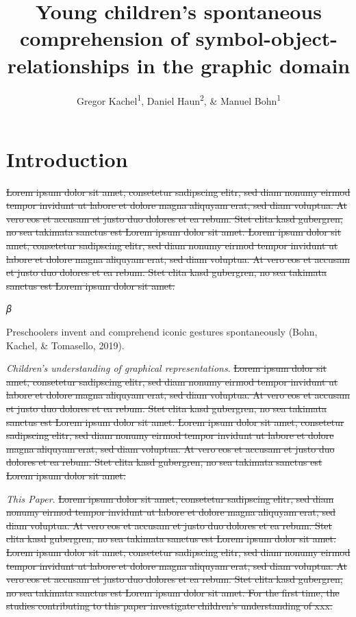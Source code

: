 \documentclass[
  man]{apa6}
\title{Young children's spontaneous comprehension of symbol-object-relationships in the graphic domain}
\author{Gregor Kachel\textsuperscript{1}, Daniel Haun\textsuperscript{2}, \& Manuel Bohn\textsuperscript{1}}
\date{}
\affiliation{\vspace{0.5cm}\textsuperscript{1} Leuphana University\\\textsuperscript{2} Max-Planck-Institute for Evolutionary Anthropology}
\begin{document}
\maketitle

\section{Introduction}\label{introduction}

\st{Lorem ipsum dolor sit amet, consetetur sadipscing elitr, sed diam nonumy eirmod tempor invidunt ut labore et dolore magna aliquyam erat, sed diam voluptua. At vero eos et accusam et justo duo dolores et ea rebum. Stet clita kasd gubergren, no sea takimata sanctus est Lorem ipsum dolor sit amet. Lorem ipsum dolor sit amet, consetetur sadipscing elitr, sed diam nonumy eirmod tempor invidunt ut labore et dolore magna aliquyam erat, sed diam voluptua. At vero eos et accusam et justo duo dolores et ea rebum. Stet clita kasd gubergren, no sea takimata sanctus est Lorem ipsum dolor sit amet.}

𝛽

Preschoolers invent and comprehend iconic gestures spontaneously (Bohn, Kachel, \& Tomasello, 2019).

\emph{Children's understanding of graphical representations}.
\st{Lorem ipsum dolor sit amet, consetetur sadipscing elitr, sed diam nonumy eirmod tempor invidunt ut labore et dolore magna aliquyam erat, sed diam voluptua. At vero eos et accusam et justo duo dolores et ea rebum. Stet clita kasd gubergren, no sea takimata sanctus est Lorem ipsum dolor sit amet. Lorem ipsum dolor sit amet, consetetur sadipscing elitr, sed diam nonumy eirmod tempor invidunt ut labore et dolore magna aliquyam erat, sed diam voluptua. At vero eos et accusam et justo duo dolores et ea rebum. Stet clita kasd gubergren, no sea takimata sanctus est Lorem ipsum dolor sit amet.}

\emph{This Paper}.
\st{Lorem ipsum dolor sit amet, consetetur sadipscing elitr, sed diam nonumy eirmod tempor invidunt ut labore et dolore magna aliquyam erat, sed diam voluptua. At vero eos et accusam et justo duo dolores et ea rebum. Stet clita kasd gubergren, no sea takimata sanctus est Lorem ipsum dolor sit amet. Lorem ipsum dolor sit amet, consetetur sadipscing elitr, sed diam nonumy eirmod tempor invidunt ut labore et dolore magna aliquyam erat, sed diam voluptua. At vero eos et accusam et justo duo dolores et ea rebum. Stet clita kasd gubergren, no sea takimata sanctus est Lorem ipsum dolor sit amet. For the first time, the studies contributing to this paper investigate children's understanding of xxx.}
\end{document}
